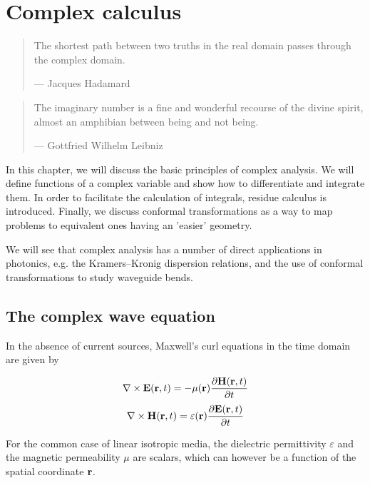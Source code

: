 \chapter{Complex calculus}
\label{h:complex}

\setcounter{page}{1}

\begin{quote}
The shortest path between two truths in the real domain passes through the
complex domain.

--- Jacques Hadamard
\end{quote}

\begin{quote}
The imaginary number is a fine and wonderful recourse of the divine spirit,
almost an amphibian between being and not being.

--- Gottfried Wilhelm Leibniz
\end{quote}

\minitoc


In this chapter, we will discuss the basic principles of complex analysis. We
will define functions of a complex variable and show how to differentiate and
integrate them. In order to facilitate the calculation of integrals, residue
calculus is introduced. Finally, we discuss conformal transformations as a way
to map problems to equivalent ones having an 'easier' geometry. 

We will see that complex analysis has a number of direct applications in
photonics, e.g. the Kramers--Kronig dispersion relations, and the use of
conformal transformations to study waveguide bends.

\section{The complex wave equation}

In the absence of current sources, Maxwell's curl equations in the time domain
are given by

\begin{equation}
      \nabla \times {\bf E} ({\bf r},t) = - \mu({\bf r)} \frac{\partial {\bf H}
({\bf r} ,t)}{\partial t} \label{eq-rot-E}
\end{equation}
\begin{equation}
      \nabla \times {\bf H} ({\bf r},t) = \varepsilon({\bf r}) \frac{\partial
{\bf E}({\bf r},t)}{\partial t} \label{eq-rot-H}
\end{equation}

For the common case of linear isotropic media, the dielectric permittivity
$\varepsilon$ and the magnetic permeability $\mu$ are scalars, which can however
be a function of the spatial coordinate ${\bf r}$.

